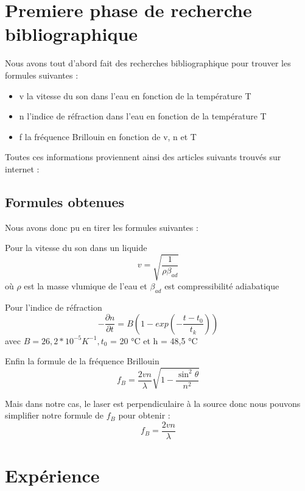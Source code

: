 \documentclass{rapportECC}
\begin{document}
\section{Premiere phase de recherche bibliographique}

Nous avons tout d’abord fait des recherches bibliographique pour trouver les formules suivantes :

\begin{itemize}
    \item v  la vitesse du son dans l’eau en fonction de la température T
    \item n l’indice de réfraction dans l’eau en fonction de la température T
    \item f la fréquence Brillouin en fonction de v, n et T
\end{itemize}

Toutes ces informations proviennent ainsi des articles suivants trouvés sur internet :
\cite{}


\subsection{Formules obtenues}

Nous avons donc pu en tirer les formules suivantes :

Pour la vitesse du son dans un liquide
\begin{equation}
    v = \sqrt{\frac{1}{\rho \beta_{ad}}}
\end{equation}
où $\rho$ est la masse vlumique de l'eau et $\beta_{ad}$ est compressibilité adiabatique

Pour l'indice de réfraction 
\begin{equation}
    -\frac{\partial n}{\partial t} = B(1-exp(-\frac{t-t_0}{t_k}))
\end{equation}
avec $B=26,2*10^{-5} K^{-1}, t_0$ = 20 °C et h = 48,5 °C

Enfin la formule de la fréquence Brillouin
\begin{equation}
    f_B = \frac{2vn}{\lambda}\sqrt{1-\frac{\sin^2{\theta}}{n^2}}
\end{equation}

Mais dans notre cas, le laser est perpendiculaire à la source donc nous pouvons simplifier notre formule de $f_B$ pour obtenir :
\begin{equation}
    f_B =  \frac{2vn}{\lambda}
\end{equation}

\section{Expérience}
\end{document}
